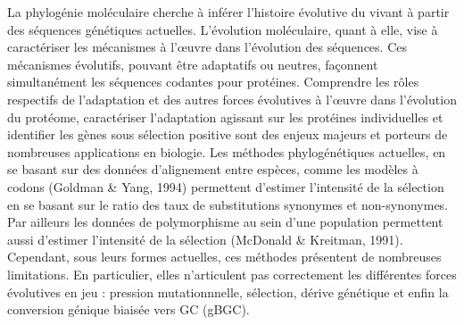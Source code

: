 La phylogénie moléculaire cherche à inférer l’histoire évolutive du vivant à partir des séquences génétiques actuelles.
L'évolution moléculaire, quant à elle, vise à caractériser les mécanismes à l’œuvre dans l'évolution des séquences.
Ces mécanismes évolutifs, pouvant être adaptatifs ou neutres, façonnent simultanément les séquences codantes pour protéines.
Comprendre les rôles respectifs de l'adaptation et des autres forces évolutives à l’œuvre dans l'évolution du protéome, caractériser l'adaptation agissant sur les protéines individuelles et identifier les gènes sous sélection positive sont des enjeux majeurs et porteurs de nombreuses applications en biologie.
Les méthodes phylogénétiques actuelles, en se basant sur des données d'alignement entre espèces, comme les modèles à codons (Goldman \& Yang, 1994) permettent d'estimer l'intensité de la sélection en se basant sur le ratio des taux de substitutions synonymes et non-synonymes.
Par ailleurs les données de polymorphisme au sein d'une population permettent aussi d'estimer l'intensité de la sélection (McDonald \& Kreitman, 1991).
Cependant, sous leurs formes actuelles, ces méthodes présentent de nombreuses limitations.
En particulier, elles n'articulent pas correctement les différentes forces évolutives en jeu : pression mutationnnelle, sélection, dérive génétique et enfin la conversion génique biaisée vers GC (gBGC).\\

